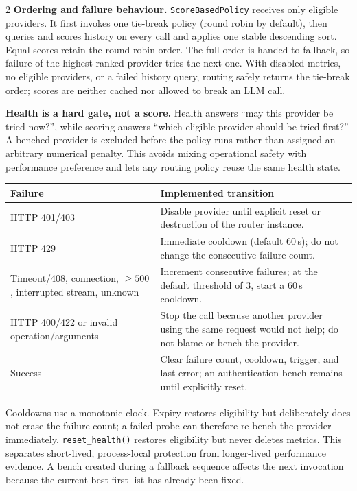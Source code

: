 \documentclass[10pt,a4paper]{article}
\newcommand{\code}[1]{\texttt{\small #1}}
\begin{document}
\begin{multicols}{2}
\textbf{Ordering and failure behaviour.}
\code{ScoreBasedPolicy} receives only eligible providers. It first invokes one
tie-break policy (round robin by default), then queries and scores history on
every call and applies one stable descending sort. Equal scores retain the
round-robin order. The full order is handed to fallback, so failure of the
highest-ranked provider tries the next one. With disabled metrics, no eligible
providers, or a failed history query, routing safely returns the tie-break order;
scores are neither cached nor allowed to break an LLM call.

\columnbreak

\textbf{Health is a hard gate, not a score.}
Health answers ``may this provider be tried now?'', while scoring answers ``which
eligible provider should be tried first?'' A benched provider is excluded before
the policy runs rather than assigned an arbitrary numerical penalty. This avoids
mixing operational safety with performance preference and lets any routing
policy reuse the same health state.

\begin{center}
\small
\begin{tabular}{@{}p{}p{}@{}}
\toprule
\textbf{Failure} & \textbf{Implemented transition}\\
\midrule
HTTP 401/403 &
Disable provider until explicit reset or destruction of the router instance.\\
HTTP 429 &
Immediate cooldown (default 60\,s); do not change the consecutive-failure count.\\
Timeout/408, connection, ${\geq}500$, interrupted stream, unknown &
Increment consecutive failures; at the default threshold of 3, start a
60\,s cooldown.\\
HTTP 400/422 or invalid operation/arguments &
Stop the call because another provider using the same request would not help;
do not blame or bench the provider.\\
Success &
Clear failure count, cooldown, trigger, and last error; an authentication bench
remains until explicitly reset.\\
\bottomrule
\end{tabular}
\end{center}

Cooldowns use a monotonic clock. Expiry restores eligibility but deliberately
does not erase the failure count; a failed probe can therefore re-bench the
provider immediately. \code{reset\_health()} restores eligibility but never
deletes metrics. This separates short-lived, process-local protection from
longer-lived performance evidence. A bench created during a fallback sequence
affects the next invocation because the current best-first list has already
been fixed.


\end{multicols}
\end{document}
